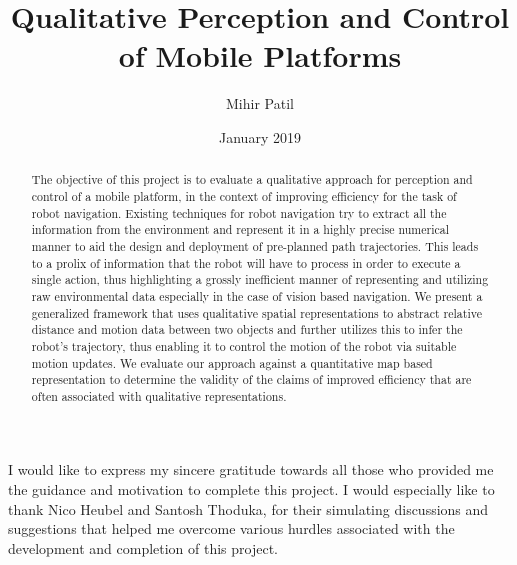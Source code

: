 \documentclass[rnd]{mas_report}
\author{Mihir Patil}
\title{Qualitative Perception and Control of Mobile Platforms}
\date{January  2019}
\begin{document}
\begin{titlepage}
    \maketitle
\end{titlepage}


\pagestyle{plain}


\cleardoublepage
\statementpage

\begin{abstract}
\paragraph{}The objective of this project is to evaluate a qualitative approach for perception and control of a mobile platform, in the context of improving efficiency for the task of robot navigation. Existing techniques for robot navigation try to extract all the information from the environment and represent it in a highly precise numerical manner to aid the design and deployment of pre-planned path trajectories. This leads to a prolix of information that the robot will have to process in order to execute a single action, thus highlighting a grossly inefficient manner of representing and utilizing raw environmental data especially in the case of vision based navigation. We present a generalized framework that uses qualitative spatial representations to abstract relative distance and motion data between two objects and further utilizes this to infer the robot's trajectory, thus enabling it to control the motion of the robot via suitable motion updates. We evaluate our approach against a quantitative map based representation to determine the validity of the claims of improved efficiency that are often associated with qualitative representations.
\end{abstract}

\begin{acknowledgements}
\paragraph{}I would like to express my sincere gratitude towards  all those who provided me the guidance and motivation to complete this project.  I would especially like to thank Nico Heubel and Santosh Thoduka, for their simulating discussions and suggestions
that helped me overcome various hurdles associated with the development and completion of this project.
\end{acknowledgements}
\end{document}
